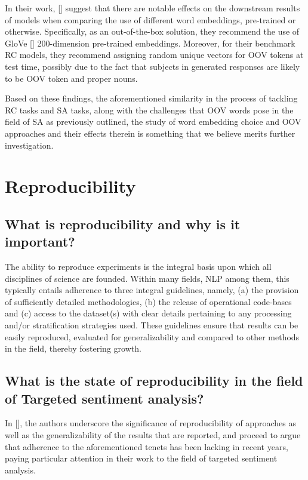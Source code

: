 \documentclass[12pt, a4paper]{report}
\theoremstyle{definition}
\theoremstyle{definition}%
\theoremstyle{definition}%
\theoremstyle{definition}%
\theoremstyle{definition}%
\theoremstyle{definition}%
\renewcommand{\cite}[1]{[\citealp{#1}]}
\begin{document}
In their work, \cite{bhuwandhingra2017} suggest that there are notable effects on the downstream results of models when comparing the use of different word embeddings, pre-trained or otherwise. Specifically, as an out-of-the-box solution, they recommend the use of GloVe \cite{pennington} 200-dimension pre-trained embeddings. Moreover, for their benchmark RC models, they recommend assigning random unique vectors for OOV tokens at test time, possibly due to the fact that subjects in generated responses are likely to be OOV token and proper nouns.

Based on these findings, the aforementioned similarity in the process of tackling RC tasks and SA tasks, along with the challenges that OOV words pose in the field of SA as previously outlined, the study of word embedding choice and OOV approaches and their effects therein is something that we believe merits further investigation.

\section{Reproducibility}
\subsection{What is reproducibility and why is it important?}
The ability to reproduce experiments is the integral basis upon which all disciplines of science are founded. Within many fields, NLP among them, this typically entails adherence to three integral guidelines, namely, (a) the provision of sufficiently detailed methodologies, (b) the release of operational code-bases and (c) access to the dataset(s) with clear details pertaining to any processing and/or stratification strategies used. These guidelines ensure that results can be easily reproduced, evaluated for generalizability and compared to other methods in the field, thereby fostering growth.

\subsection{What is the state of reproducibility in the field of Targeted sentiment analysis?}
In \cite{moore2018}, the authors underscore the significance of reproducibility of approaches as well as the generalizability of the results that are reported, and proceed to argue that adherence to the aforementioned tenets has been lacking in recent years, paying particular attention in their work to the field of targeted sentiment analysis.
\end{document}
